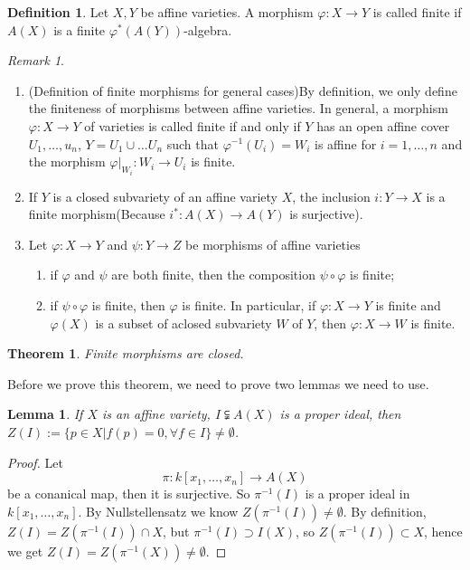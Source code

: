 \documentclass{amsart}
\theoremstyle{plain}
\newtheorem{theorem}{Theorem}
\newtheorem{lemma}{Lemma}
\theoremstyle{definition}
\newtheorem{definition}{Definition}
\theoremstyle{remark}
\newtheorem*{remark}{Remark}
\numberwithin{equation}{section}
\begin{document}
 \begin{definition}
 	Let $ X,Y $ be affine varieties. A morphism $ \varphi:X\to Y $ is called finite if $ A(X) $ is a finite $ \varphi^{\ast}(A(Y)) $-algebra.
 \end{definition}
 \begin{remark}
 	\begin{enumerate}
 		\item (Definition of finite morphisms for general cases)By definition, we only define the finiteness of morphisms between affine varieties. In general, a morphism $ \varphi:X\to Y $ of varieties is called finite if and only if $ Y $ has an open affine cover $ U_1,\dots,u_n $, $ Y=U_1\cup\dots U_n $ such that $ \varphi^{-1}(U_i)=W_i $ is affine for $i=1,\dots,n  $ and the morphism $ \varphi|_{W_i}:W_i\to U_i $ is finite.
 		\item If $ Y $ is a closed subvariety of an affine variety $ X $, the inclusion $ i:Y\to X $ is a finite morphism(Because $ i^\ast :A(X)\to A(Y) $ is surjective).
 		\item Let $ \varphi:X\to Y $ and $ \psi:Y\to Z $ be morphisms of affine varieties 
 		\begin{enumerate}
 			\item if $ \varphi $ and $ \psi $ are both finite, then the composition $ \psi\circ\varphi $ is finite;
 			\item if $ \psi\circ \varphi  $ is finite, then $ \varphi $ is finite. In particular, if $ \varphi:X\to Y $ is finite and $ \varphi(X) $ is a subset of aclosed subvariety $ W $ of $ Y $, then $ \varphi:X\to W $ is finite.
 		\end{enumerate} 
  	\end{enumerate}
 \end{remark}

 \begin{theorem}\label{13-3}
 	Finite morphisms are closed.
 \end{theorem}
 Before we prove this theorem, we need to prove two lemmas we need to use.
  \begin{lemma}\label{13-1}
  	If $ X $ is an affine variety, $ I\subsetneqq A(X) $ is a proper ideal, then $ Z(I):= \lbrace p\in X|f(p)=0, \forall f\in I \rbrace\neq \emptyset $.
  \end{lemma}
  \begin{proof}
  	Let 
  	$$
  	\pi:k[x_1,\dots,x_n] \to A(X)
  	$$
  	be a conanical map, then it is surjective. So $ \pi^{-1}(I) $ is a proper ideal in $ k[x_1,\dots,x_n] $. By Nullstellensatz we know $ Z(\pi^{-1}(I))\neq \emptyset $. By definition, $ Z(I)=Z(\pi^{-1}(I))\cap X $, but $ \pi^{-1}(I)\supset I(X) $, so $ Z(\pi^{-1}(I))\subset X $, hence we get $ Z(I)=Z(\pi^{-1}(X))\neq \emptyset $.
  \end{proof}
  
\end{document}
